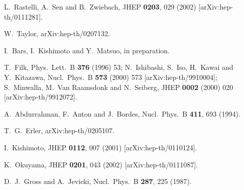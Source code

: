 \documentclass[a4paper,11pt]{article}
\begin{document}
\begin{thebibliography}{99}
 {\small %
L.~Rastelli, A.~Sen and B.~Zwiebach, %
JHEP \textbf{0203}, 029 (2002) [arXiv:hep-th/0111281].
}

 {\small W.~Taylor,
arXiv:hep-th/0207132. %
}


 {\small
I.~Bars, I.~Kishimoto and Y.~Matsuo, in preparation.
}


{\small T.~Filk, %
Phys.\ Lett.\ B \textbf{376} (1996) 53;\newline
N.~Ishibashi, S.~Iso, H.~Kawai and Y.~Kitazawa,
Nucl.\ Phys.\ B \textbf{573} (2000) 573 [arXiv:hep-th/9910004];\newline
S.~Minwalla, M.~Van Raamsdonk and N.~Seiberg,
JHEP \textbf{0002} (2000) 020 [arXiv:hep-th/9912072]. }

 {\small A.~Abdurrahman, F.~Anton and J.~Bordes,
Nucl.\ Phys.\ B \textbf{411}, 693 (1994). %
}

{\small %
}

 {\small T.~G.~Erler,
arXiv:hep-th/0205107. %
}

{\small %
}

 {\small I.~Kishimoto,
JHEP \textbf{0112}, 007 (2001) [arXiv:hep-th/0110124].
}

{\small %
}

 {\small K.~Okuyama,
JHEP \textbf{0201}, 043 (2002) [arXiv:hep-th/0111087].
}

 {\small %
D.~J.~Gross and A.~Jevicki,
Nucl.\ Phys.\ B \textbf{287}, 225 (1987). %
}

{\small %
}


\end{thebibliography}
\end{document}
